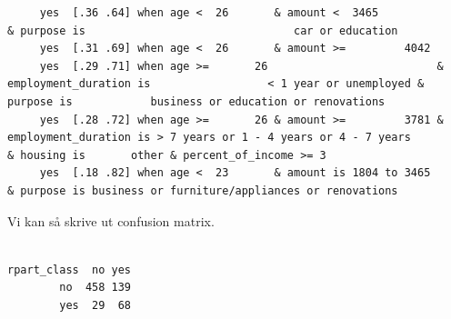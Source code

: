 \documentclass[
  letterpaper,
  DIV=11,
  numbers=noendperiod]{scrreprt}
\newenvironment{Shaded}{\begin{snugshade}}{\end{snugshade}}
\newcommand{\AttributeTok}[1]{\textcolor[rgb]{0.40,0.45,0.13}{#1}}
\newcommand{\FunctionTok}[1]{\textcolor[rgb]{0.28,0.35,0.67}{#1}}
\newcommand{\NormalTok}[1]{\textcolor[rgb]{0.00,0.23,0.31}{#1}}
\newcommand{\OtherTok}[1]{\textcolor[rgb]{0.00,0.23,0.31}{#1}}
\newcommand{\SpecialCharTok}[1]{\textcolor[rgb]{0.37,0.37,0.37}{#1}}
\newcommand{\StringTok}[1]{\textcolor[rgb]{0.13,0.47,0.30}{#1}}
\theoremstyle{definition}
\theoremstyle{remark}
\begin{document}
\begin{verbatim}
     yes  [.36 .64] when age <  26       & amount <  3465                                                                          & purpose is                                car or education                                                  
     yes  [.31 .69] when age <  26       & amount >=         4042                                                                                                                                                                                
     yes  [.29 .71] when age >=       26                          & employment_duration is                  < 1 year or unemployed & purpose is            business or education or renovations                                                  
     yes  [.28 .72] when age >=       26 & amount >=         3781 & employment_duration is > 7 years or 1 - 4 years or 4 - 7 years                                                              & housing is       other & percent_of_income >= 3
     yes  [.18 .82] when age <  23       & amount is 1804 to 3465                                                                  & purpose is business or furniture/appliances or renovations                                                  
\end{verbatim}

Vi kan så skrive ut confusion matrix.

\begin{Shaded}
\end{Shaded}

\begin{verbatim}
           
rpart_class  no yes
        no  458 139
        yes  29  68
\end{verbatim}

\begin{Shaded}
\end{Shaded}
\end{document}
